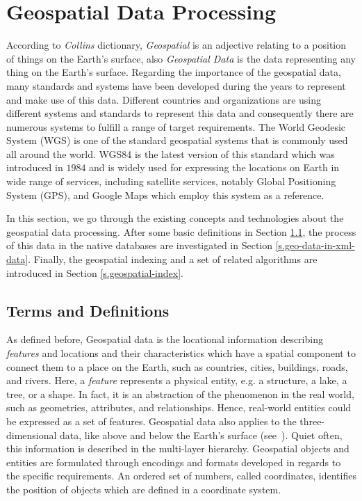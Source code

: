\documentclass[a4paper,12pt]{article}
\begin{document}
\newpage
\section{Geospatial Data Processing}
\label{s.method}
According to \emph{Collins} dictionary, \emph{Geospatial} is an adjective relating to a position of things on the Earth's surface, also \emph{Geospatial Data} is the data representing any thing on the Earth's surface. Regarding the importance of the geospatial data, many standards and systems have been developed  during the years to represent and make use of this data. Different countries and organizations are using different systems and standards to represent this data and consequently there are numerous systems to fulfill a range of target requirements. The World Geodesic System (WGS) is one of the standard geospatial systems that is commonly used all around the world. WGS84 is the latest version of this standard which
was introduced in $1984$ and is widely used for expressing the locations on Earth in wide range of services, including satellite services, notably Global Positioning System (GPS), and Google Maps which employ this system as a reference.

In this section, we go through the existing concepts and technologies about the geospatial data processing. After some basic definitions in Section \ref{termsanddef}, the process of this data in the native databases are investigated in Section \ref{s.geo-data-in-xml-data}.
Finally, the geospatial indexing and a set of related algorithms are introduced in Section \ref{s.geospatial-index}.

\subsection{Terms and Definitions}
\label{termsanddef}
As defined before, Geospatial data is the locational information describing \textit{features} and locations and their characteristics which have a spatial component to connect them to a place on the Earth, such as countries, cities, buildings, roads, and rivers. Here, a \textit{feature} represents a physical entity, e.g. a structure, a lake, a tree, or a shape. In fact, it is an abstraction of the phenomenon in the real world, such as geometries, attributes, and relationships. Hence, real-world entities could be expressed as a set of features.
Geospatial data also applies to the three-dimensional data, like above and below the Earth's surface (see~\cite{powell}). Quiet often, this information is described in the multi-layer hierarchy. Geospatial objects and entities are formulated through encodings and formats developed in regards to the specific requirements. An ordered set of numbers, called coordinates, identifies the position of objects which are defined in a coordinate system. 
\end{document}
